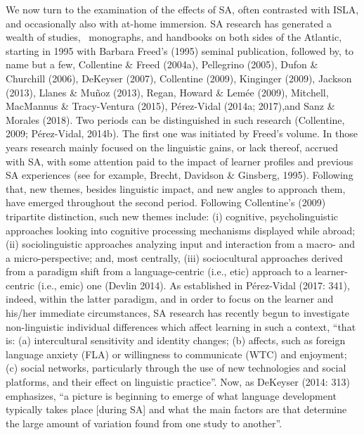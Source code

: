 \documentclass[12pt]{article}
\newenvironment{styleStandard}{\setlength\leftskip{0cm}\setlength\rightskip{0cm plus 1fil}\setlength\parindent{0cm}\setlength\parfillskip{0pt plus 1fil}\setlength\parskip{0in plus 1pt}\writerlistparindent\writerlistleftskip\leavevmode\normalfont\normalsize\writerlistlabel\ignorespaces}{\unskip\vspace{0.111in plus 0.0111in}\par}
\newcommand\writerlistleftskip{}
\newcommand\writerlistparindent{}
\newcommand\writerlistlabel{}
\begin{document}
\begin{styleStandard}
We now turn to the examination of the effects of SA, often contrasted with ISLA, and occasionally also with at-home immersion. SA research has generated a wealth of studies, \ monographs, and handbooks on both sides of the Atlantic, starting in 1995 with Barbara Freed’s (1995) seminal publication, followed by, to name but a few, Collentine \& Freed (2004a), Pellegrino (2005), Dufon \& Churchill (2006), DeKeyser (2007), Collentine (2009), Kinginger (2009), Jackson (2013), Llanes \& Muñoz (2013), Regan, Howard \& Lemée (2009), Mitchell, MacMannus \& Tracy-Ventura (2015), Pérez-Vidal (2014a; 2017),and Sanz \& Morales (2018). Two periods can be distinguished in such research (Collentine, 2009; Pérez-Vidal, 2014b). The first one was initiated by Freed’s volume. In those years research mainly focused on the linguistic gains, or lack thereof, accrued with SA, with some attention paid to the impact of learner profiles and previous SA experiences (see for example, Brecht, Davidson \& Ginsberg, 1995). Following that, new themes, besides linguistic impact, and new angles to approach them, have emerged throughout the second period. Following Collentine’s (2009) tripartite distinction, such new themes include: (i) cognitive, psycholinguistic approaches looking into cognitive processing mechanisms displayed while abroad; (ii) sociolinguistic approaches analyzing input and interaction from a macro- and a micro-perspective; and, most centrally, (iii) sociocultural approaches derived from a paradigm shift from a language-centric (i.e., etic) approach to a learner-centric (i.e., emic) one (Devlin 2014). As established in Pérez-Vidal (2017: 341), indeed, within the latter paradigm, and in order to focus on the learner and his/her immediate circumstances, SA research has recently begun to investigate non-linguistic individual differences which affect learning in such a context, “that is: (a) intercultural sensitivity and identity changes; (b) affects, such as foreign language anxiety (FLA) or willingness to communicate (WTC) and enjoyment; (c) social networks, particularly through the use of new technologies and social platforms, and their effect on linguistic practice”. Now, as DeKeyser (2014: 313) emphasizes, “a picture is beginning to emerge of what language development typically takes place [during SA] and what the main factors are that determine the large amount of variation found from one study to another”. 
\end{styleStandard}
\end{document}
